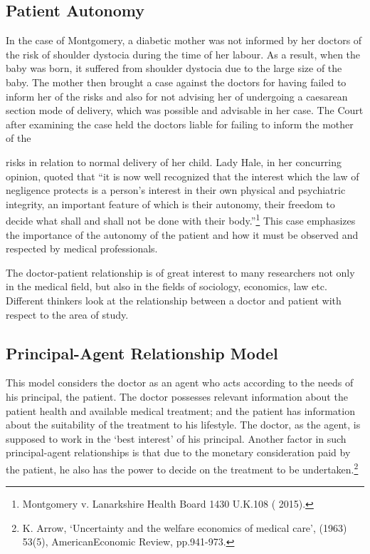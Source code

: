 \begin{multicols}{2}
\subsection*{Patient Autonomy}

\noi
In the case of Montgomery, a diabetic mother was not informed by her doctors of the
risk of shoulder dystocia during the time of her labour. As a result, when the baby was
born, it suffered from shoulder dystocia due to the large size of the baby. The mother
then brought a case against the doctors for having failed to inform her of the risks and
also for not advising her of undergoing a caesarean section mode of delivery, which
was possible and advisable in her case. The Court after examining the case held the
doctors liable for failing to inform the mother of the

\noi
risks in relation to normal delivery of her child. Lady Hale, in her concurring opinion,
quoted that “it is now well recognized that the interest which the law of negligence
protects is a person’s interest in their own physical and psychiatric integrity, an
important feature of which is their autonomy, their freedom to decide what shall and
shall not be done with their body.”\footnote{Montgomery v. Lanarkshire Health Board 1430 U.K.108 ( 2015).} This case emphasizes the importance of the autonomy of the patient and how it must be observed and respected by medical professionals.


\noi
The doctor-patient relationship is of great interest to many researchers not only in the
medical field, but also in the fields of sociology, economics, law etc. Different thinkers
look at the relationship between a doctor and patient with respect to the area of study.

\subsection*{Principal-Agent Relationship Model}

\noi
This model considers the doctor as an agent who acts according to the needs of his
principal, the patient. The doctor possesses relevant information about the patient health
and available medical treatment; and the patient has information about the suitability of
the treatment to his lifestyle. The doctor, as the agent, is supposed to work in the ‘best
interest’ of his principal. Another factor in such principal-agent relationships is that due
to the monetary consideration paid by the patient, he also has the power to decide on the
treatment to be undertaken.\footnote{K. Arrow, ‘Uncertainty and the welfare economics of medical care’, (1963) 53(5), AmericanEconomic Review, pp.941-973.}


\end{multicols}
